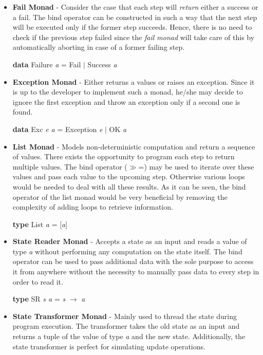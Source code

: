 \documentclass[a4paper, onecolumn]{article}
\begin{document}
    \begin{itemize}
        \item \textbf{Fail Monad} - Consider the case that each step will \textit{return} either a success or a fail. The bind operator can be constructed in such a way that the next step will be executed only if the former step succeeds. Hence, there is no need to check if the previous step failed since the \textit{fail monad} will take care of this by automatically aborting in case of a former failing step.
        \begin{center}
            \textbf{data} Failure \textit{a} = Fail $\vert$ Success \textit{a} 
        \end{center}
        \item \textbf{Exception Monad} - Either returns a values or raises an exception. Since it is up to the developer to implement such a monad, he/she may decide to ignore the first exception and throw an exception only if a second one is found. 
        \begin{center}
            \textbf{data} Exc \textit{e a} = Exception \textit{e} $\vert$ OK \textit{a}
        \end{center}
        \item \textbf{List Monad} - Models non-deterministic computation and return a sequence of values. There exists the opportunity to program each step to return multiple values. The bind operator ($\gg$=) may be used to iterate over these values and pass each value to the upcoming step. Otherwise various loops would be needed to deal with all these results. As it can be seen, the bind operator of the list monad would be very beneficial by removing the complexity of adding loops to retrieve information. 
        \begin{center}
            \textbf{type} List \textit{a} = [\textit{a}]
        \end{center}
        \item \textbf{State Reader Monad} - Accepts a state as an input and reads a value of type \textit{a} without performing any computation on the state itself. The bind operator can be used to pass additional data with the sole purpose to access it from anywhere without the necessity to manually pass data to every step in order to read it. 
        \begin{center}
            \textbf{type} SR \textit{s a} = \textit{s} $\rightarrow$ \textit{a}
        \end{center}
        \item \textbf{State Transformer Monad} - Mainly used to thread the state during program execution. The transformer takes the old state as an input and returns a tuple of the value of type \textit{a} and the new state. Additionally, the state transformer is perfect for simulating update operations.

\end{itemize}
\end{document}
